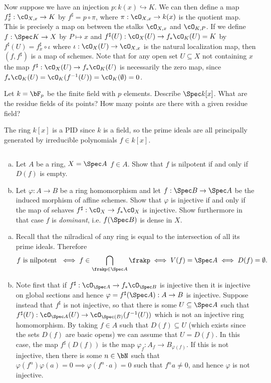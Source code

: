\begin{homework}[e]
\begin{prf}
		Now suppose we have an injection $p:k(x) \hookrightarrow K$. We can then define a map $f^\sharp_x:\cO_{X,x}\to K$ by $f^{\sharp} = p\circ \pi$, where $\pi:\cO_{X,x}\to k(x)$ is the quotient map. This is precisely a map on between the stalks $\cO_{X,x}$ and $\cO_{K,P}$. If we define $f:\Spec K\to X$ by $P\mapsto x$ and $f^\sharp(U):\cO_X(U) \to f_*\cO_K(U) = K$ by $f^\sharp(U) = f^{\sharp}_x \circ \iota$ where $\iota:\cO_X(U) \to \cO_{X,x}$ is the natural localization map, then $(f,f^\sharp)$ is a map of schemes. Note that for any open set $U \subseteq X$ not containing $x$ the map $f^\sharp:\cO_X(U)\to f_*\cO_K(U)$ is necessarily the zero map, since $f_*\cO_K(U) = \cO_K(f^{-1}(U)) = \cO_K(\emptyset) = 0$.
	\end{prf}
	 Let $k = \bF_p$ be the finite field with $p$ elements. Describe $\Spec k[x]$. What are the residue fields of its points? How many points are there with a given residue field?
	\begin{prf}
		The ring $k[x]$ is a PID since $k$ is a field, so the prime ideals are all principally generated by irreducible polynomials $f \in k[x]$.
	\end{prf}
	$ $
	\begin{enumerate}[(a)]
		\item Let $A$ be a ring, $X = \Spec A$ $f \in A$. Show that $f$ is nilpotent if and only if $D(f)$ is empty.
		\item Let $\varphi:A\to B$ be a ring homomorphism and let $f:\Spec B\to \Spec A$ be the induced morphism of affine schemes. Show that $\varphi$ is injective if and only if the map of sehaves $f^\sharp:\cO_X \to f_*\cO_X$ is injective. Show furthermore in that case $f$ is \emph{dominant}, i.e. $f(\Spec B)$ is dense in $X$.
	\end{enumerate}
	\begin{prf}
		\begin{enumerate}[(a)]
			\item Recall that the nilradical of any ring is equal to the intersection of all its prime ideals. Therefore
				\begin{align*}
					f \text{ is nilpotent } \iff f \in \bigcap_{\frakp \in \Spec A} \frakp \iff V(f) = \Spec A \iff D(f) = \emptyset.
				\end{align*}
			\item Note first that if $f^\sharp:\cO_{\Spec A}\to f_*\cO_{\Spec B}$ is injective then it is injective on global sections and hence $\varphi = f^\sharp(\Spec A): A\to B$ is injective. Suppose instead that $f^\sharp$ is not injective, so that there is some $U\subseteq \Spec A$ such that $f^\sharp(U):\cO_{\Spec A}(U) \to \cO_{\Spec(B)}(f^{-1}(U))$ which is not an injective ring homomorphism. By taking $f\in A$ such that $D(f) \subseteq U$ (which exists since the sets $D(f)$ are basic opens) we can assume that $U = D(f)$. In this case, the map $f^\sharp(D(f))$ is the map $\varphi_f:A_f \to B_{\varphi(f)}$. If this is not injective, then there is some $n\in \bN$ such that $\varphi(f^n)\varphi(a) = 0\implies \varphi(f^n\cdot a) = 0$ such that $f^na\neq 0$, and hence $\varphi$ is not injective.


\end{enumerate}
\end{prf}
\end{homework}
